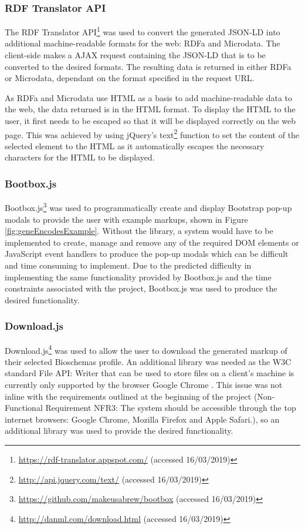 {
\subsubsection{RDF Translator API}
The RDF Translator API\footnote{\url{https://rdf-translator.appspot.com/} (accessed 16/03/2019)} was used to convert the generated JSON-LD into additional machine-readable formats for the web: RDFa and Microdata. The client-side makes a AJAX request containing the JSON-LD that is to be converted to the desired formats. The resulting data is returned in either RDFa or Microdata, dependant on the format specified in the request URL. 

As RDFa and Microdata use HTML as a basis to add machine-readable data to the web, the data returned is in the HTML format. To display the HTML to the user, it first needs to be escaped so that it will be displayed correctly on the web page. This was achieved by using jQuery's text\footnote{\url{http://api.jquery.com/text/} (accessed 16/03/2019)} function to set the content of the selected element to the HTML as it automatically escapes the necessary characters for the HTML to be displayed.

\subsubsection{Bootbox.js}
Bootbox.js\footnote{\url{https://github.com/makeusabrew/bootbox} (accessed 16/03/2019)} was used to programmatically create and display Bootstrap pop-up modals to provide the user with example markups, shown in Figure \ref{fig:geneEncodesExample}. Without the library, a system would have to be implemented to create, manage and remove any of the required DOM elements or JavaScript event handlers to produce the pop-up modals which can be difficult and time consuming to implement. Due to the predicted difficulty in implementing the same functionality provided by Bootbox.js and the time constraints associated with the project, Bootbox.js was used to produce the desired functionality.


\subsubsection{Download.js}
Download.js\footnote{\url{http://danml.com/download.html} (accessed 16/03/2019)} was used to allow the user to download the generated markup of their selected Bioschemas profile. An additional library was needed as the W3C standard File API: Writer that can be used to store files on a client's machine is currently only supported by the browser Google Chrome \cite{fileAPI}\cite{fileAPISupport}. This issue was not inline with the requirements outlined at the beginning of the project (Non-Functional Requirement NFR3: The system should be accessible through the top internet browsers: Google Chrome, Mozilla Firefox and Apple Safari.), so an additional library was used to provide the desired functionality.
}


